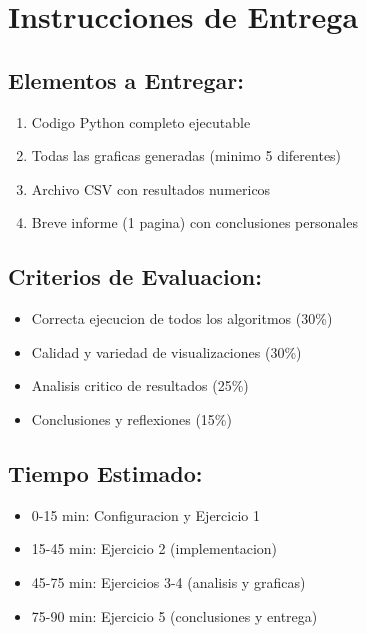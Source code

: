 \documentclass[12pt]{article}
\begin{document}
\section*{Instrucciones de Entrega}

\subsection*{Elementos a Entregar:}
\begin{enumerate}
    \item Codigo Python completo ejecutable
    \item Todas las graficas generadas (minimo 5 diferentes)
    \item Archivo CSV con resultados numericos
    \item Breve informe (1 pagina) con conclusiones personales
\end{enumerate}

\subsection*{Criterios de Evaluacion:}
\begin{itemize}
    \item Correcta ejecucion de todos los algoritmos (30\%)
    \item Calidad y variedad de visualizaciones (30\%)
    \item Analisis critico de resultados (25\%)
    \item Conclusiones y reflexiones (15\%)
\end{itemize}

\subsection*{Tiempo Estimado:}
\begin{itemize}
    \item 0-15 min: Configuracion y Ejercicio 1
    \item 15-45 min: Ejercicio 2 (implementacion)
    \item 45-75 min: Ejercicios 3-4 (analisis y graficas)
    \item 75-90 min: Ejercicio 5 (conclusiones y entrega)
\end{itemize}
\end{document}

